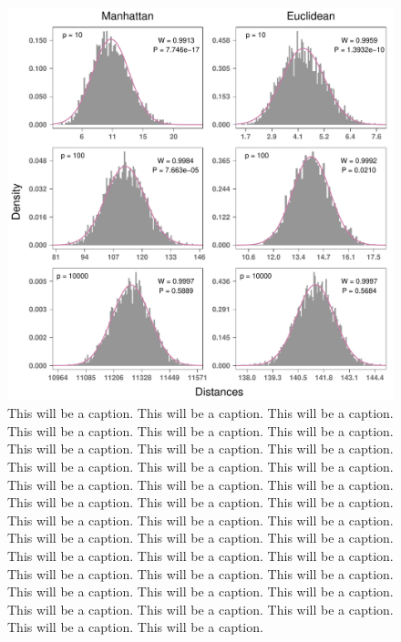 \documentclass[10pt,letterpaper]{article}\usepackage[]{graphicx}\usepackage[]{color}
\begin{document}
\begin{figure}[H]
	\includegraphics[width=\textwidth]{central_limit_hist_normal_standard.pdf}
	\caption{This will be a caption. This will be a caption. This will be a caption. This will be a caption. This will be a caption. This will be a caption. This will be a caption. This will be a caption. This will be a caption. This will be a caption. This will be a caption. This will be a caption. This will be a caption. This will be a caption. This will be a caption. This will be a caption. This will be a caption. This will be a caption. This will be a caption. This will be a caption. This will be a caption. This will be a caption. This will be a caption. This will be a caption. This will be a caption. This will be a caption. This will be a caption. This will be a caption. This will be a caption. This will be a caption. This will be a caption. This will be a caption. This will be a caption. This will be a caption. This will be a caption. This will be a caption. This will be a caption. This will be a caption.}
\end{figure}
\end{document}
